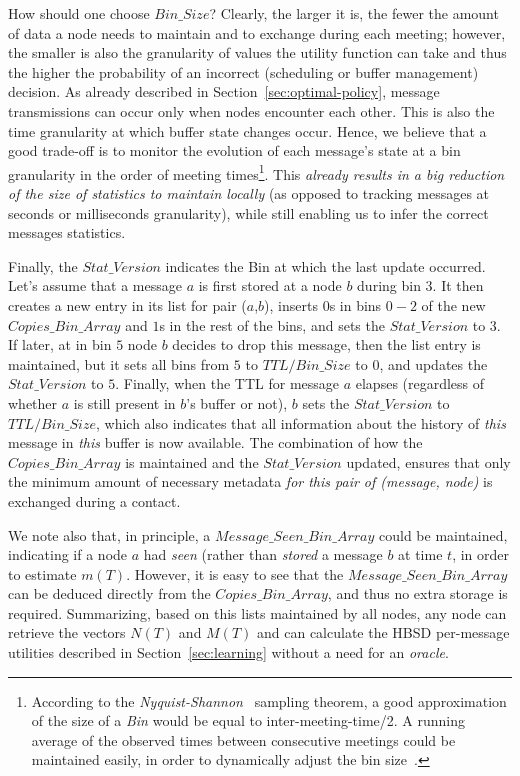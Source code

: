 How should one choose $Bin\_Size$? Clearly, the larger it is, the fewer the amount of data a node needs to maintain and to exchange during each meeting; however, the smaller is also the granularity of values the utility function can take and thus the higher the probability of an incorrect (scheduling or buffer management) decision. As already described in Section~\ref{sec:optimal-policy}, message transmissions can occur only when nodes encounter each other. This is also the time granularity at which buffer state changes occur. Hence, we believe that a good trade-off is to monitor the evolution of each message's state at a bin granularity in the order of meeting times\footnote{According to the \emph{Nyquist-Shannon}~\cite{Nyquist} sampling theorem, a good approximation of the size of a \emph{Bin} would be equal to inter-meeting-time/2. A running average of the observed times between consecutive meetings could be maintained easily, in order to dynamically adjust the bin size~\cite{akis:ton-multi}.}. This \emph{already results in a big reduction of the size of statistics to maintain locally} (as opposed to tracking messages at seconds or milliseconds granularity), while still enabling us to infer the correct messages statistics.

Finally, the $Stat\_Version$ indicates the Bin at which the last update occurred. Let's assume that a message $a$ is first stored at a node $b$ during bin $3$. It then creates a new entry in its list for pair ($a$,$b$), inserts $0$s in bins $0-2$ of the new $Copies\_Bin\_Array$ and $1$s in the rest of the bins, and sets the $Stat\_Version$ to $3$. If later, at in bin $5$ node $b$ decides to drop this message, then the list entry is maintained, but it sets all bins from $5$ to $TTL/Bin\_Size$ to $0$, and updates the $Stat\_Version$ to $5$. Finally, when the TTL for message $a$ elapses (regardless of whether $a$ is still present in $b$'s buffer or not), $b$ sets the $Stat\_Version$ to $TTL/Bin\_Size$, which also indicates that all information about the history of \emph{this} message in \emph{this} buffer is now available. The combination of how the $Copies\_Bin\_Array$ is maintained and the $Stat\_Version$ updated, ensures that only the minimum amount of necessary metadata \emph{for this pair of (message, node)} is exchanged during a contact.

We note also that, in principle, a $Message\_Seen\_Bin\_Array$ could be maintained, indicating if a node $a$ had \emph{seen} (rather than \emph{stored} a message $b$ at time $t$, in order to estimate $m(T)$. However, it is easy to see that the $Message\_Seen\_Bin\_Array$ can be deduced directly from the $Copies\_Bin\_Array$, and thus no extra storage is required.
Summarizing, based on this lists maintained by all nodes, any node can retrieve the vectors $N(T)$ and $M(T)$ and can calculate the HBSD per-message utilities described in Section~\ref{sec:learning} without a need for an \emph{oracle}.

